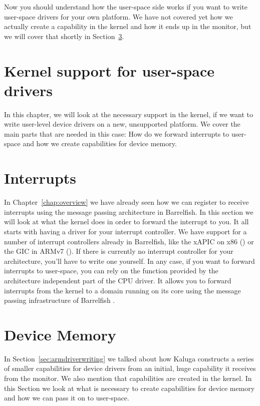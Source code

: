 \documentclass[a4paper,11pt,twoside]{report}
\begin{document}
Now you should understand how the user-space side works if you want to write
user-space drivers for your own platform. We have not covered yet how we
actually create a capability in the kernel and how it ends up in the monitor,
but we will cover that shortly in Section~\ref{sec:kernelmemory}.

\section{Kernel support for user-space drivers}
\label{chap:kernel}

In this chapter, we will look at the necessary support in the kernel, if we
want to write user-level device drivers on a new, unsupported platform. We
cover the main parts that are needed in this case: How do we forward
interrupts to user-space and how we create capabilities for device memory.

\section{Interrupts}
\label{sec:kernelirq}

In Chapter~\ref{chap:overview} we have already seen how we can register to
receive interrupts using the message passing architecture in Barrelfish. In
this section we will look at what the kernel does in order to forward the
interrupt to you. It all starts with having a driver for your interrupt
controller. We have support for a number of interrupt controllers already in
Barrelfish, like the xAPIC on x86 () or the GIC in
ARMv7 (). If there is currently no interrupt
controller for your architecture, you'll have to write one yourself. In any
case, if you want to forward interrupts to user-space, you can rely on the
 function provided by the architecture
independent part of the CPU driver. It allows you to forward interrupts
from the kernel to a domain running on its core using the message passing
infrastructure of Barrelfish \cite{btn011-idc}.


\section{Device Memory}
\label{sec:kernelmemory}

In Section~\ref{sec:armdriverwriting} we talked about how Kaluga constructs a
series of smaller capabilities for device drivers from an initial, huge
capability it receives from the monitor. We also mention that capabilities are
created in the kernel. In this Section we look at what is necessary to
create capabilities for device memory and how we can pass it on to user-space.
\end{document}
